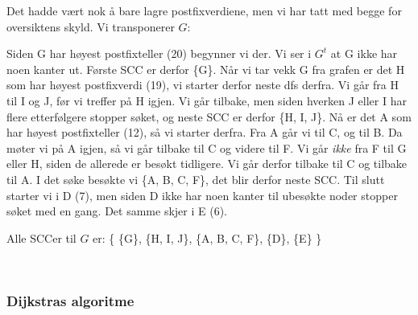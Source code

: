 \begin{example}
\noindent Det hadde vært nok å bare lagre postfixverdiene, men vi har tatt med begge for oversiktens skyld. Vi transponerer $ G $:

\begin{figure}[H]
\centering
{}
\end{figure}

Siden G har høyest postfixteller (20) begynner vi der. Vi ser i $ G^t $ at G ikke har noen kanter ut. Første SCC er derfor \{G\}. Når vi tar vekk G fra grafen er det H som har høyest postfixverdi (19), vi starter derfor neste dfs derfra. Vi går fra H til I og J, før vi treffer på H igjen. Vi går tilbake, men siden hverken J eller I har flere etterfølgere stopper søket, og neste SCC er derfor \{H, I, J\}. Nå er det A som har høyest postfixteller (12), så vi starter derfra. Fra A går vi til C, og til B. Da møter vi på A igjen, så vi går tilbake til C og videre til F. Vi går \emph{ikke} fra F til G eller H, siden de allerede er besøkt tidligere. Vi går derfor tilbake til C og tilbake til A. I det søke besøkte vi \{A, B, C, F\}, det blir derfor neste SCC. Til slutt starter vi i D (7), men siden D ikke har noen kanter til ubesøkte noder stopper søket med en gang. Det samme skjer i E (6). 

Alle SCCer til $ G $ er: \{ \{G\}, \{H, I, J\}, \{A, B, C, F\}, \{D\}, \{E\} \}
\end{example}
~\\
\subsubsection{Dijkstras algoritme}
\label{dijkstra}

